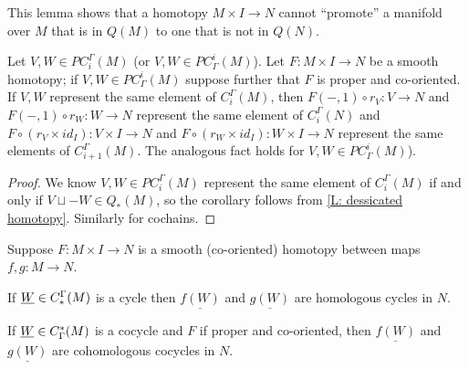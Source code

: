This lemma shows that a homotopy $M \times I \to N$ cannot ``promote'' a manifold over $M$ that is in $Q(M)$ to one that is not in $Q(N)$.

\begin{corollary}
	Let $V, W \in PC_i^\Gamma(M)$ (or $V, W \in PC^i_\Gamma(M)$).
	Let $F \colon M \times I \to N$ be a smooth homotopy; if $V,W \in PC^i_\Gamma(M)$ suppose further that $F$ is proper and co-oriented.
	If $V,W$ represent the same element of $C_i^\Gamma(M)$, then $F(-,1) \circ r_V: V \to N$ and
	$F(-,1) \circ r_W \colon W \to N$ represent the same element of $C_i^\Gamma(N)$ and $F \circ (r_V \times id_I) \colon V \times I \to N$ and $F \circ (r_W \times id_I) \colon W \times I \to N$ represent the same elements of $C_{i+1}^\Gamma(M)$.
	The analogous fact holds for $V, W \in PC^i_\Gamma(M)$).
\end{corollary}

\begin{proof}
	We know $V, W \in PC_i^\Gamma(M)$ represent the same element of $C_i^\Gamma(M)$ if and only if $V \sqcup -W \in Q_*(M)$, so the corollary follows from \cref{L: dessicated homotopy}.
	Similarly for cochains.
\end{proof}

\begin{corollary}\label{C: homotopy}
	Suppose $F \colon M \times I \to N$ is a smooth (co-oriented) homotopy between maps $f,g \colon M \to N$.

	If $\underline{W} \in C_*^\Gamma(M)$ is a cycle then $\underline{f(W)}$ and $\underline{g(W)}$ are homologous cycles in $N$.

	If $\underline{W} \in C^*_\Gamma(M)$ is a cocycle and $F$ if proper and co-oriented, then $\underline{f(W)}$ and $\underline{g(W)}$ are cohomologous cocycles in $N$.
\end{corollary}

